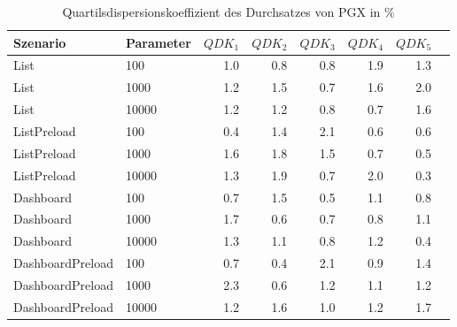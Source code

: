 
\begin{table}[ht]
\setlength{\extrarowheight}{-1pt}
\centering
\caption{Quartilsdispersionskoeffizient des Durchsatzes von PGX in \%}
\begin{tabular}{llrrrrrr}
\toprule
Szenario & Parameter & ${QDK_1}$ & ${QDK_2}$ & ${QDK_3}$& ${QDK_4}$ & ${QDK_5}$ \\
\midrule
	List & 100 &  1.0 &  0.8 &  0.8 &  1.9 &  1.3 \\
	List & 1000 &  1.2 &  1.5 &  0.7 &  1.6 &  2.0 \\
	List & 10000 &  1.2 &  1.2 &  0.8 &  0.7 &  1.6 \\
	ListPreload & 100 &  0.4 &  1.4 & \cellcolor{red!11}  2.1 &  0.6 &  0.6 \\
	ListPreload & 1000 &  1.6 &  1.8 &  1.5 &  0.7 &  0.5 \\
	ListPreload & 10000 &  1.3 &  1.9 &  0.7 & \cellcolor{red!11}  2.0 &  0.3 \\
	Dashboard & 100 &  0.7 &  1.5 &  0.5 &  1.1 &  0.8 \\
	Dashboard & 1000 &  1.7 &  0.6 &  0.7 &  0.8 &  1.1 \\
	Dashboard & 10000 &  1.3 &  1.1 &  0.8 &  1.2 &  0.4 \\
	DashboardPreload & 100 &  0.7 &  0.4 & \cellcolor{red!11}  2.1 &  0.9 &  1.4 \\
	DashboardPreload & 1000 & \cellcolor{red!11}  2.3 &  0.6 &  1.2 &  1.1 &  1.2 \\
	DashboardPreload & 10000 &  1.2 &  1.6 &  1.0 &  1.2 &  1.7 \\
\bottomrule
\end{tabular}
\label{tab:quartilsdispersionskoeffizient_durchsatz_pgx}
\end{table}
	